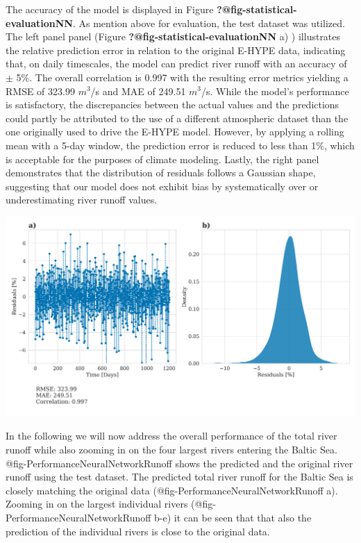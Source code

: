 \documentclass[
]{agujournal2019}
\begin{document}
The accuracy of the model is displayed in Figure
\textbf{?@fig-statistical-evaluationNN}. As mention above for
evaluation, the test dataset was utilized. The left panel panel (Figure
\textbf{?@fig-statistical-evaluationNN} a) ) illustrates the relative
prediction error in relation to the original E-HYPE data, indicating
that, on daily timescales, the model can predict river runoff with an
accuracy of \(\pm\) 5\(\%\). The overall correlation is 0.997 with the
resulting error metrics yielding a RMSE of 323.99 \(m^3\)/s and MAE of
249.51 \(m^3\)/s. While the model's performance is satisfactory, the
discrepancies between the actual values and the predictions could partly
be attributed to the use of a different atmospheric dataset than the one
originally used to drive the E-HYPE model. However, by applying a
rolling mean with a 5-day window, the prediction error is reduced to
less than 1\(\%\), which is acceptable for the purposes of climate
modeling. Lastly, the right panel demonstrates that the distribution of
residuals follows a Gaussian shape, suggesting that our model does not
exhibit bias by systematically over or underestimating river runoff
values.

\includegraphics{../src/figures/paper_error_metrics.png}

In the following we will now address the overall performance of the
total river runoff while also zooming in on the four largest rivers
entering the Baltic Sea. @fig-PerformanceNeuralNetworkRunoff shows the
predicted and the original river runoff using the test dataset. The
predicted total river runoff for the Baltic Sea is closely matching the
original data (@fig-PerformanceNeuralNetworkRunoff a). Zooming in on the
largest individual rivers (@fig-PerformanceNeuralNetworkRunoff b-e) it
can be seen that that also the prediction of the individual rivers is
close to the original data.
\end{document}
